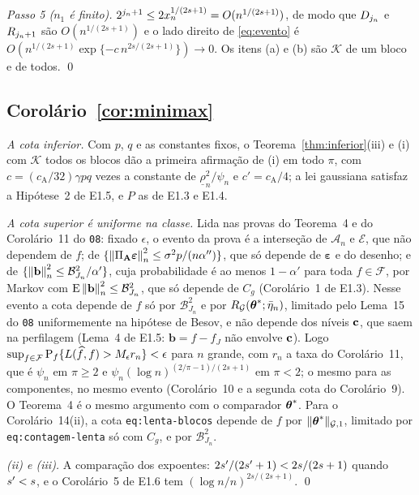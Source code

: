 \documentclass[11pt,a4paper]{article}
\newcommand{\Kcal}{\mathcal{K}}
\newcommand{\Fcal}{\mathcal{F}}
\newcommand{\rlow}{\underline{\rho}_{n}}
\newcommand{\cA}{c_{\mathrm{A}}}
\newcommand{\Acal}{\mathcal{A}_{n}}
\newcommand{\Ecal}{\mathcal{E}}
\newcommand{\PA}{\Pi_{\mathbf{A}}}
\newcommand{\bveps}{\boldsymbol{\varepsilon}}
\newcommand{\bb}{\mathbf{b}}
\newcommand{\Rid}{R_{\mathcal{G}}}
\newcommand{\nGone}[1]{\lVert #1\rVert_{\mathcal{G},1}}
\begin{document}
\emph{Passo 5 ($n_{1}$ é finito).} $2^{j_{n}+1} \le
2x_{n}^{1/(2s+1)} = O(n^{1/(2s+1)})$, de modo que $D_{j_{n}}$ e
$R_{j_{n}+1}$ são $O(n^{1/(2s+1)})$ e o lado direito de \eqref{eq:evento}
é $O(n^{1/(2s+1)}\exp\{-c\,n^{2s/(2s+1)}\}) \to 0$. Os itens (a) e (b) são
$\Kcal$ de um bloco e de todos. \qed

\subsection*{Corolário~\ref{cor:minimax}}

\emph{A cota inferior.} Com $p$, $q$ e as constantes fixos, o
Teorema~\ref{thm:inferior}(iii) e (i) com $\Kcal$ todos os blocos dão a
primeira afirmação de (i) em todo $\pi$, com $c = (\cA/32)\gamma pq$ vezes a
constante de $\rlow^{2}/\psi_{n}$ e $c' = \cA/4$; a lei gaussiana satisfaz a
Hipótese~2 de E1.5, e $P$ as de E1.3 e E1.4.

\emph{A cota superior é uniforme na classe.} Lida nas provas do Teorema~4 e
do Corolário~11 do \texttt{08}: fixado $\epsilon$, o evento da prova é a
interseção de $\Acal$ e $\Ecal$, que não dependem de $f$; de
$\{\normn{\PA\bveps}^{2} \le \sigma^{2}p/(n\alpha'')\}$, que só depende de
$\bveps$ e do desenho; e de $\{\normn{\bb}^{2} \le
\mathcal{B}_{J_{n}}^{2}/\alpha'\}$, cuja probabilidade é ao menos
$1-\alpha'$ para toda $f \in \Fcal$, por Markov com $\E\normn{\bb}^{2} \le
\mathcal{B}_{J_{n}}^{2}$, que só depende de $C_{g}$ (Corolário~1 de E1.3).
Nesse evento a cota depende de $f$ só por $\mathcal{B}_{J_{n}}^{2}$ e por
$\Rid(\thetastar;\bar\eta_{n})$, limitado pelo Lema~15 do \texttt{08}
uniformemente na hipótese de Besov, e não depende dos níveis $\mathbf{c}$, que saem
na perfilagem (Lema~4 de E1.5: $\bb = f - f_{J}$ não envolve $\mathbf{c}$). Logo
$\sup_{f\in\Fcal}\Prob_{f}\{L(\widehat f,f) > M_{\epsilon}r_{n}\} < \epsilon$
para $n$ grande, com $r_{n}$ a taxa do Corolário~11, que é $\psi_{n}$ em
$\pi \ge 2$ e $\psi_{n}(\log n)^{(2/\pi-1)/(2s+1)}$ em $\pi < 2$; o mesmo
para as componentes, no mesmo evento (Corolário~10 e a segunda cota do
Corolário~9). O Teorema~4 é o mesmo argumento com o comparador $\boldsymbol{\theta}^{*}$.
Para o Corolário~14(ii), a cota \texttt{eq:lenta-blocos} depende de $f$ por
$\nGone{\thetastar}$, limitado por \texttt{eq:contagem-lenta} só com
$C_{g}$, e por $\mathcal{B}_{J_{n}}^{2}$.

\emph{(ii) e (iii).} A comparação dos expoentes: $2s'/(2s'+1) <
2s/(2s+1)$ quando $s' < s$, e o Corolário~5 de E1.6 tem
$(\log n/n)^{2s/(2s+1)}$. \qed
\end{document}
